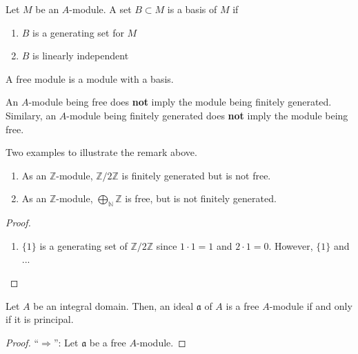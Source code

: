 \begin{defbox}
    \begin{definition}
        Let \(M\) be an \(A\)-module. A set \(B \subset M\) is a basis of \(M\) if
        \begin{enumerate}
            \item \(B\) is a generating set for \(M\)
            \item \(B\) is linearly independent
        \end{enumerate}
        A free module is a module with a basis.
    \end{definition}
\end{defbox}

\begin{rembox}
    \begin{remark}
        An \(A\)-module being free does \textbf{not} imply the module being finitely generated. Similary, an \(A\)-module being finitely generated does \textbf{not} imply the module being free.
    \end{remark}
\end{rembox}

\begin{exmbox}
    \begin{example}
        Two examples to illustrate the remark above.
        \begin{enumerate}
            \item As an \(\mathbb{Z}\)-module, \(\mathbb{Z} / 2 \mathbb{Z}\) is finitely generated but is not free.
            \item As an \(\mathbb{Z}\)-module, \(\bigoplus_{\mathbb{N}} \mathbb{Z}\) is free, but is not finitely generated.
        \end{enumerate}
    \end{example}
\end{exmbox}

\begin{proof}
    \begin{enumerate}
        \item \(\{1\}\) is a generating set of \(\mathbb{Z}/2\mathbb{Z}\) since \(1 \cdot 1 = 1\) and \(2 \cdot 1 = 0\). However, \(\{1\}\) and ...
    \end{enumerate}
\end{proof}

\begin{thmbox}
    \begin{lemma}
        Let \(A\) be an integral domain. Then, an ideal \(\mathfrak{a}\) of \(A\) is a free \(A\)-module if and only if it is principal.
    \end{lemma}
\end{thmbox}
\begin{proof}
    ``\(\Rightarrow\)'': Let \(\mathfrak{a}\) be a free \(A\)-module.
\end{proof}


